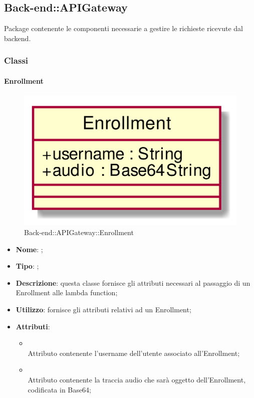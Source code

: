 \subsection{Back-end::APIGateway}
Package contenente le componenti necessarie a gestire le richieste ricevute dal backend.
\subsubsection{Classi}
\hypertarget{Enrollment_label}{\paragraph{Enrollment}}
\begin{figure}[h]
	\centering
	\includegraphics[width=\textwidth,height=\textheight,keepaspectratio]{images/ClassEnrollment.png}
	\caption{Back-end::APIGateway::Enrollment}
\end{figure}
\begin{itemize}
	\item \textbf{Nome}: ;
	\item \textbf{Tipo}: ;
	\item \textbf{Descrizione}: questa classe fornisce gli attributi necessari al passaggio di un Enrollment alle lambda function;
	\item \textbf{Utilizzo}: fornisce gli attributi relativi ad un Enrollment;
	\item \textbf{Attributi}:
	\begin{itemize}
		\item[]  \\
		Attributo contenente l'username dell'utente associato all'Enrollment;
		\item[]  \\
		Attributo contenente la traccia audio che sarà oggetto dell'Enrollment, codificata in Base64;
	\end{itemize}
\end{itemize}

